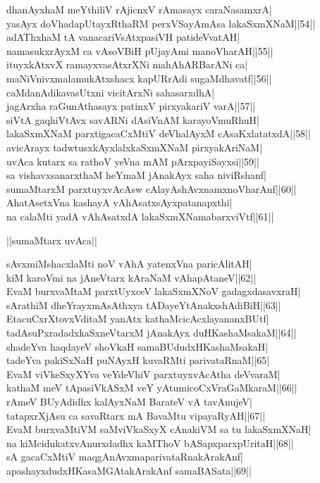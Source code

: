 \documentclass{article}
\begin{document}
dhanAyxhaM meYthiliV rAjicnxV rAmasayx caraNasamxrA|\\
yasAyx doVhadapUtayxRthaRM perxVSayAmAsa lakaSxmXNaM||54||\\
adAThxhaM tA vanacariVsAtxpasiVH patideVvatAH|\\
namasukxrAyxM ca vAsoVBiH pUjayAmi manoVharAH||55||\\
ituyxkAtxvX ramayxvasAtxrXNi mahAhARBarANi ca|\\
maNiVnivxmalamukAtxshacx kapURrAdi sugaMdhavatf||56||\\
caMdanAdikavasUtxni vicitArxNi sahasarxdhA|\\
jagArxha raGunAthasayx patinxV pirxyakariV varA||57||\\
siVtA gaqhiVtAvx savARNi dAsiVnAM karayoVmuRhuH|\\
lakaSxmXNaM parxtigacaCxMtiV deVhalAyxM cAsaKxlatatxdA||58||\\
avicArayx tadwtusxkAyxlalxkaSxmXNaM pirxyakAriNaM|\\
uvAca kutarx sa rathoV yeVna mAM pArxpayiSayxsi||59||\\
sa vishavxsanarxthaM heYmaM jAnakAyx saha niviRshanf|\\
sumaMtarxM parxtuyxvAcAsw cAlayAshAvxnamxnoVharAnf||60||\\
AhatAsetxVna kashayA vAhAsatxsAyxpatanapxthi|\\
na calaMti yadA vAhAsatxdA lakaSxmXNamabarxviVtf||61||\\

\begin{center}
||sumaMtarx uvAca||
\end{center}

sAvxmiMshacxlaMti noV vAhA yatenxVna paricAlitAH|\\
kiM karoVmi na jAneVtarx kAraNaM vAhapAtaneV||62||\\
EvaM burxvaMtaM parxtUyxceV lakaSxmXNoV gadagxdasavxraH|\\
sArathiM dheYrayxmAsAthxya tADayeYtAnakxshAdiBiH||63||\\
EtacuCxrXtovxVditaM yanAtx kathaMcicAcxlayananxBUtf|\\
tadAsuPxradadxkaSxneVtarxM jAnakAyx duHKashaMsakaM||64||\\
shadeYva haqdayeV shoVkaH samaBUdudxHKashaMsakaH|\\
tadeYva pakiSxNaH puNAyxH kuvaRMti parivataRnaM||65|\\
EvaM viVkeSxyXYva veYdeVhiV parxtuyxvAcAtha deVvaraM|\\
kathaM meV tApasiVkASxM veY yAtumicoCxVraGaMkaraM||66||\\
rAmeV BUyAdidhx kalAyxNaM BarateV vA tavAnujeV|\\
tatapxrXjAsu ca savaRtarx mA BavaMtu vipayaRyAH||67||\\
EvaM burxvaMtiVM saMviVkaSxyX cAnakiVM sa tu lakaSxmXNaH|\\
na kiMcidukatxvAnurxdadhx kaMThoV bASapxparxpUritaH||68||\\
sA gacaCxMtiV maqgAnAvxmaparivataRnakArakAnf|\\
apashayxdudxHKasaMGAtakArakAnf samaBASata||69||\\
\end{document}
